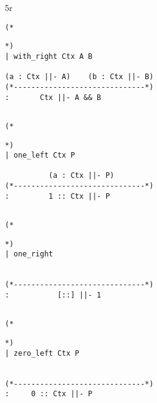 5r\documentclass{article}
\theoremstyle{definition}
\begin{document}
\noindent\begin{minipage}{\textwidth}
\begin{verbatim}
(*
\end{verbatim}
\begin{center}\usebox{\withR}\end{center}
\begin{verbatim}
*)
| with_right Ctx A B 

(a : Ctx ||- A)    (b : Ctx ||- B)
(*------------------------------*)
:       Ctx ||- A && B


\end{verbatim}
\end{minipage}

\noindent\begin{minipage}{\textwidth}
\begin{verbatim}
(*
\end{verbatim}
\begin{center}\usebox{\oneL}\end{center}
\begin{verbatim}
*)
| one_left Ctx P

          (a : Ctx ||- P)
(*------------------------------*)
:         1 :: Ctx ||- P


\end{verbatim}
\end{minipage}

\noindent\begin{minipage}{\textwidth}
\begin{verbatim}
(*
\end{verbatim}
\begin{center}\usebox{\oneR}\end{center}
\begin{verbatim}
*)
| one_right


(*------------------------------*)
:           [::] ||- 1


\end{verbatim}
\end{minipage}

\noindent\begin{minipage}{\textwidth}
\begin{verbatim}
(*
\end{verbatim}
\begin{center}\usebox{\zeroL}\end{center}
\begin{verbatim}
*)
| zero_left Ctx P


(*------------------------------*)
:     0 :: Ctx ||- P


\end{verbatim}
\end{minipage}
\end{document}
